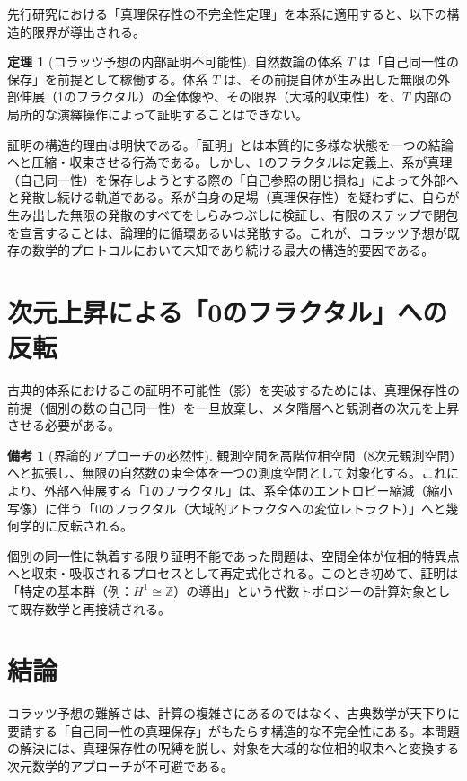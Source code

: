 \documentclass[11pt,a4paper]{article}
\theoremstyle{definition}
\newtheorem{theorem}{定理}[section]
\newtheorem{remark}{備考}[section]
\begin{document}
先行研究における「真理保存性の不完全性定理」を本系に適用すると、以下の構造的限界が導出される。

\begin{theorem}[コラッツ予想の内部証明不可能性]
自然数論の体系 $T$ は「自己同一性の保存」を前提として稼働する。体系 $T$ は、その前提自体が生み出した無限の外部伸展（1のフラクタル）の全体像や、その限界（大域的収束性）を、$T$ 内部の局所的な演繹操作によって証明することはできない。
\end{theorem}

証明の構造的理由は明快である。「証明」とは本質的に多様な状態を一つの結論へと圧縮・収束させる行為である。しかし、1のフラクタルは定義上、系が真理（自己同一性）を保存しようとする際の「自己参照の閉じ損ね」によって外部へと発散し続ける軌道である。系が自身の足場（真理保存性）を疑わずに、自らが生み出した無限の発散のすべてをしらみつぶしに検証し、有限のステップで閉包を宣言することは、論理的に循環あるいは発散する。これが、コラッツ予想が既存の数学的プロトコルにおいて未知であり続ける最大の構造的要因である。

\section{次元上昇による「0のフラクタル」への反転}

古典的体系におけるこの証明不可能性（影）を突破するためには、真理保存性の前提（個別の数の自己同一性）を一旦放棄し、メタ階層へと観測者の次元を上昇させる必要がある。

\begin{remark}[界論的アプローチの必然性]
観測空間を高階位相空間（8次元観測空間）へと拡張し、無限の自然数の束全体を一つの測度空間として対象化する。これにより、外部へ伸展する「1のフラクタル」は、系全体のエントロピー縮減（縮小写像）に伴う「0のフラクタル（大域的アトラクタへの変位レトラクト）」へと幾何学的に反転される。
\end{remark}

個別の同一性に執着する限り証明不能であった問題は、空間全体が位相的特異点へと収束・吸収されるプロセスとして再定式化される。このとき初めて、証明は「特定の基本群（例：$H^1 \cong \mathbb{Z}$）の導出」という代数トポロジーの計算対象として既存数学と再接続される。

\section{結論}
コラッツ予想の難解さは、計算の複雑さにあるのではなく、古典数学が天下りに要請する「自己同一性の真理保存」がもたらす構造的な不完全性にある。本問題の解決には、真理保存性の呪縛を脱し、対象を大域的な位相的収束へと変換する次元数学的アプローチが不可避である。
\end{document}
